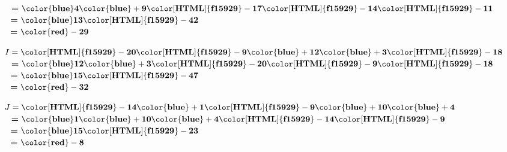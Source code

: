 \begin{corrige}
\begin{multicols}
\begin{list}{}
            $ \phantom{A }\textbf{=}~\mathbf{{\color{blue}4}}\mathbf{{\color{blue}+9}}\mathbf{{\color[HTML]{f15929}-17}}\mathbf{{\color[HTML]{f15929}-14}}\mathbf{{\color[HTML]{f15929}-11}}$\\
            $ \phantom{A }\textbf{=}~\mathbf{{\color{blue}13}}\mathbf{{\color[HTML]{f15929}-42}}$\\
            $ \phantom{A }\textbf{=}~\mathbf{{\color{red}-29}} $
            \item $ I = \mathbf{{\color[HTML]{f15929}-20}}\mathbf{{\color[HTML]{f15929}-9}}\mathbf{{\color{blue}+12}}\mathbf{{\color{blue}+3}}\mathbf{{\color[HTML]{f15929}-18}}$\\
            $ \phantom{A }\textbf{=}~\mathbf{{\color{blue}12}}\mathbf{{\color{blue}+3}}\mathbf{{\color[HTML]{f15929}-20}}\mathbf{{\color[HTML]{f15929}-9}}\mathbf{{\color[HTML]{f15929}-18}}$\\
            $ \phantom{A }\textbf{=}~\mathbf{{\color{blue}15}}\mathbf{{\color[HTML]{f15929}-47}}$\\
            $ \phantom{A }\textbf{=}~\mathbf{{\color{red}-32}} $
            \item $ J = \mathbf{{\color[HTML]{f15929}-14}}\mathbf{{\color{blue}+1}}\mathbf{{\color[HTML]{f15929}-9}}\mathbf{{\color{blue}+10}}\mathbf{{\color{blue}+4}}$\\
            $ \phantom{A }\textbf{=}~\mathbf{{\color{blue}1}}\mathbf{{\color{blue}+10}}\mathbf{{\color{blue}+4}}\mathbf{{\color[HTML]{f15929}-14}}\mathbf{{\color[HTML]{f15929}-9}}$\\
            $ \phantom{A }\textbf{=}~\mathbf{{\color{blue}15}}\mathbf{{\color[HTML]{f15929}-23}}$\\
            $ \phantom{A }\textbf{=}~\mathbf{{\color{red}-8}} $
        \end{list}
    \end{multicols}
\end{corrige}